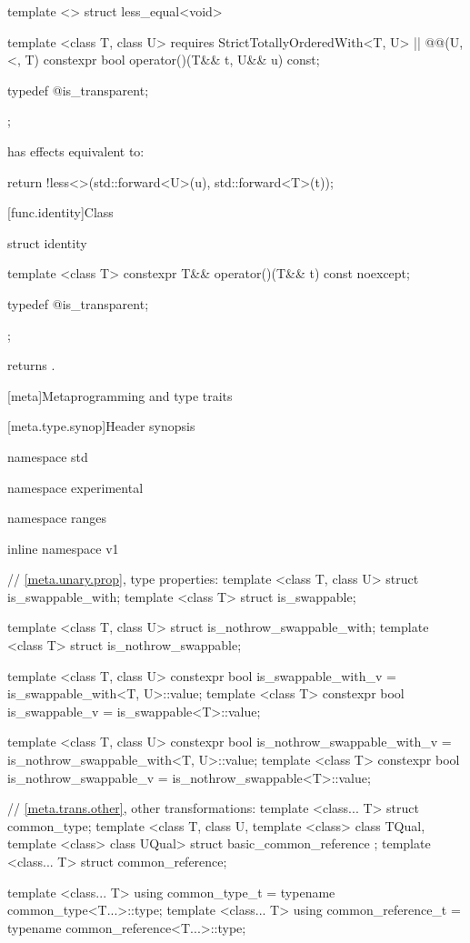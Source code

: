 %
\begin{itemdecl}
template <> struct less_equal<void> {
  template <class T, class U>
    requires StrictTotallyOrderedWith<T, U> || @\textit{}@(U, <, T)
  constexpr bool operator()(T&& t, U&& u) const;

  typedef @\unspec@ is_transparent;
};
\end{itemdecl}

\begin{itemdescr}
\pnum
{} has effects equivalent to:
\begin{codeblock}
return !less<>{}(std::forward<U>(u), std::forward<T>(t));
\end{codeblock}
\end{itemdescr}

[func.identity]{Class }

%
\begin{itemdecl}
struct identity {
  template <class T>
  constexpr T&& operator()(T&& t) const noexcept;

  typedef @\unspec@ is_transparent;
};
\end{itemdecl}

\begin{itemdescr}
\pnum
{} returns .

\end{itemdescr}

[meta]{Metaprogramming and type traits}

[meta.type.synop]{Header  synopsis}
\begin{codeblock}
namespace std { namespace experimental { namespace ranges { inline namespace v1 {
  // \ref{meta.unary.prop}, type properties:
  template <class T, class U> struct is_swappable_with;
  template <class T> struct is_swappable;

  template <class T, class U> struct is_nothrow_swappable_with;
  template <class T> struct is_nothrow_swappable;

  template <class T, class U> constexpr bool is_swappable_with_v
    = is_swappable_with<T, U>::value;
  template <class T> constexpr bool is_swappable_v
    = is_swappable<T>::value;

  template <class T, class U> constexpr bool is_nothrow_swappable_with_v
    = is_nothrow_swappable_with<T, U>::value;
  template <class T> constexpr bool is_nothrow_swappable_v
    = is_nothrow_swappable<T>::value;

  // \ref{meta.trans.other}, other transformations:
  template <class... T> struct common_type;
  template <class T, class U, template <class> class TQual, template <class> class UQual>
    struct basic_common_reference { };
  template <class... T> struct common_reference;
  
  template <class... T>
    using common_type_t = typename common_type<T...>::type;
  template <class... T>
    using common_reference_t = typename common_reference<T...>::type;
}}}}
\end{codeblock}

